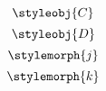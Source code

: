 {\begin{forslides}
\begin{equation}
            \styleobj{C}
        \end{equation}
        \begin{equation}
            \label{eq:50}
            \styleobj{D}
        \end{equation}
        \begin{equation}
            \label{eq:51}
            \stylemorph{j}
        \end{equation}
        \begin{equation}
            \label{eq:52}
            \stylemorph{k}
        \end{equation}
    \end{forslides}
}


